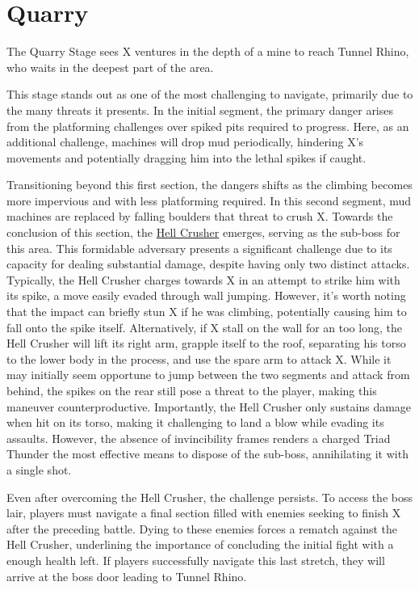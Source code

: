 \section{Quarry}
The Quarry Stage sees X ventures in the depth of a mine to reach Tunnel Rhino, who waits in the deepest part of the area.

This stage stands out as one of the most challenging to navigate, primarily due to the many threats it presents. In the initial segment, the primary danger arises from the platforming challenges over spiked pits required to progress. Here, as an additional challenge, machines will drop mud  periodically, hindering X's movements and potentially dragging him into the lethal spikes if caught.

Transitioning beyond this first section, the dangers shifts as the climbing becomes more impervious and with less platforming required. In this second segment, mud machines are replaced by falling boulders that threat to crush X. Towards the conclusion of this section, the \hyperlink{miniboss:Hell_Crusher}{Hell Crusher} emerges, serving as the sub-boss for this area. This formidable adversary presents a significant challenge due to its capacity for dealing substantial damage, despite having only two distinct attacks. Typically, the Hell Crusher charges towards X in an attempt to strike him with its spike, a move easily evaded through wall jumping. However, it's worth noting that the impact can briefly stun X if he was climbing, potentially causing him to fall onto the spike itself. Alternatively, if X stall on the wall for an too long, the Hell Crusher will lift its right arm, grapple itself to the roof, separating his torso to the lower body in the process, and use the spare arm to attack X. While it may initially seem opportune to jump between the two segments and attack from behind, the spikes on the rear still pose a threat to the player, making this maneuver counterproductive. Importantly, the Hell Crusher only sustains damage when hit on its torso, making it challenging to land a blow while evading its assaults. However, the absence of invincibility frames renders a charged Triad Thunder the most effective means to dispose of the sub-boss, annihilating it with a single shot.

Even after overcoming the Hell Crusher, the challenge persists. To access the boss lair, players must navigate a final section filled with enemies seeking to finish X after the preceding battle. Dying to these enemies forces a rematch against the Hell Crusher, underlining the importance of concluding the initial fight with a enough health left. If players successfully navigate this last stretch, they will arrive at the boss door leading to Tunnel Rhino.

